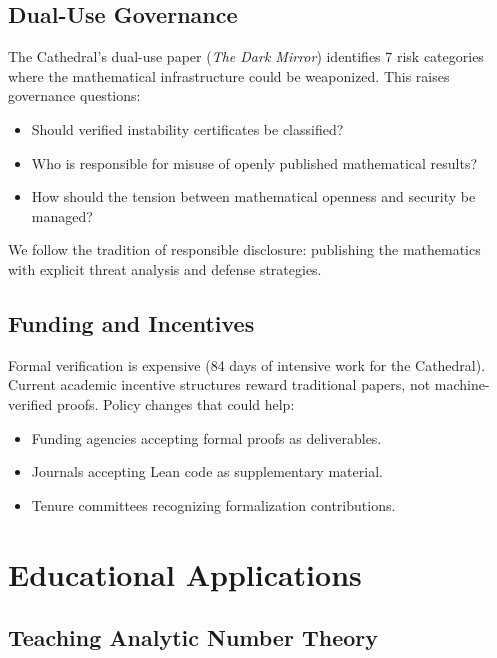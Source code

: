 \documentclass[11pt,a4paper]{article}
\begin{document}
\subsection{Dual-Use Governance}

The Cathedral's dual-use paper (\emph{The Dark Mirror}) identifies
7 risk categories where the mathematical infrastructure could be
weaponized. This raises governance questions:
\begin{itemize}
  \item Should verified instability certificates be classified?
  \item Who is responsible for misuse of openly published
    mathematical results?
  \item How should the tension between mathematical openness and
    security be managed?
\end{itemize}

We follow the tradition of responsible disclosure: publishing
the mathematics with explicit threat analysis and defense strategies.

\subsection{Funding and Incentives}

Formal verification is expensive (84 days of intensive work for
the Cathedral). Current academic incentive structures reward
traditional papers, not machine-verified proofs. Policy changes
that could help:
\begin{itemize}
  \item Funding agencies accepting formal proofs as deliverables.
  \item Journals accepting Lean code as supplementary material.
  \item Tenure committees recognizing formalization contributions.
\end{itemize}

\section{Educational Applications}

\subsection{Teaching Analytic Number Theory}
\end{document}
